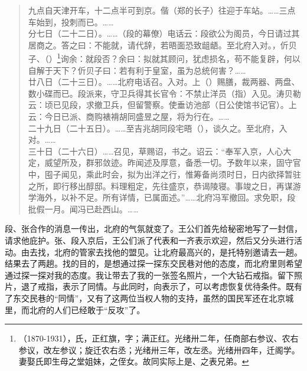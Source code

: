 \begin{quote}
	九点自天津开车，十二点半可到京。偕（郑的长子）往迎于车站。……三点车始到，投刺而已。……\\

分七日（二十二日）。……（段的幕僚）电话云：段欲公为阁员，今日请过其居商之。答之曰：不能就，请代辞，若晤面恐致龃龉。至北府入对。，伒贝子、（）\footnote{（1870-1931），氏，正红旗，字；满正红。光绪卅二年，任商部右参议、农右参议，改左参议；旋迁农右丞；光绪卅三年，改左丞。光绪卅四年，迁阁学。妻娶氏即生母之堂姐妹，之侄女。故同实际上是、之表兄弟。}询余：就段否？余曰：拟就其顾问，犹虑损名，苟不能复辟，何以自解于天下？伒贝子曰：若有利于皇室，虽为总统何害？……\\

廿八日（二十三日）。……北府电话召。入对。上（）赐膳，裁两器、两盘、数小碟而已。段派来，守卫兵得其长官令：不禁止洋员（指）入见。涛贝勒云：顷已见段，求撤卫兵，但留警察。使垂访池部（日公使馆书记官）。上云：今日已派、商购裱褙胡同盛昱之屋，将为行在。……\\

二十九日（二十五日）。……至吉兆胡同段宅晤（），谈久之。至北府，入对。……\\

三十日（二十六日）……召见，草赐诏，书之。诏云：“奉军入京，人心大定，威望所及，群邪敛迹。昨闻述及厚意，备悉一切。予数年以来，固守官中，囤子闻见，乘此时会，拟为出洋之行，惟筹备尚须时日，日内欲择暂驻之所，即行移出醇邸。料理粗定，先往盛京，恭谒陵寝。事竣之日，再谋游学海外，以补不足。所有详情，已属面述。”……北府冯军撤回。求免职，段批假一月。闻冯已赴西山。……\\
\end{quote}

段、张合作的消息一传出，北府的气氛就变了。王公们首先给秘密地写了一封信，请求他庇护。张、段入京后，王公们派了代表和一齐表示欢迎，然后又分头进行活动。由去找，北府的管家去找他的盟见。让北府最高兴的，是托特别邀请去一趟。结果去了两趟。找的目的，是想通过探一探东交民巷对他的态度，而北府里则希望通过探一探对我的态度。我让带去了我的一张签名照片，一个大钻石戒指。留下照片，退了戒指，表示了同情。与此同时，向表示了，可以考虑恢复优待条件。既有了东交民巷的“同情”，又有了这两位当权人物的支持，虽然的国民军还在北京城里，而北府的人们已经敢于“反攻”了。\\

